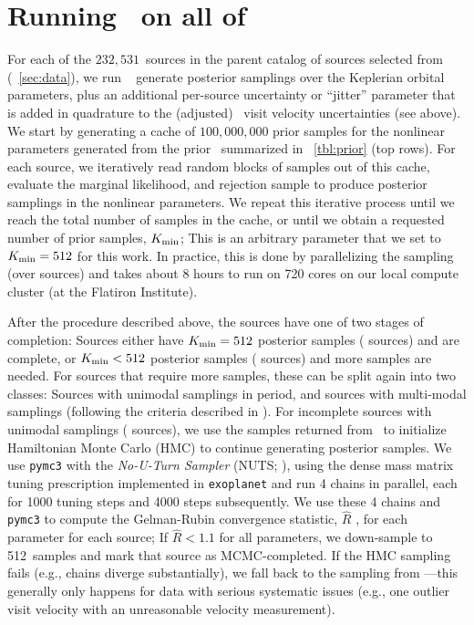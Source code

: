 \documentclass[modern]{aastex63}
\newcommand{\nsources}{\ensuremath{232,531}}
\newcommand{\Kmin}{K_{\rm min}}
\newcommand{\Kminval}{512}
\begin{document}
\section{Running \thejoker\ on all of \apogee\ } \label{sec:rundr16}

For each of the \nsources\ sources in the parent catalog of sources selected
from \apogee\  (\sectionname~\ref{sec:data}), we run \thejoker\
\citep{thejoker} generate posterior samplings over the Keplerian orbital
parameters, plus an additional per-source uncertainty or ``jitter'' parameter
that is added in quadrature to the (adjusted) \apogee\ visit velocity
uncertainties (see above).
We start by generating a cache of $100,000,000$ prior samples for the nonlinear
parameters generated from the prior \pdf\ summarized in
\tablename~\ref{tbl:prior} (top rows).
For each source, we iteratively read random blocks of samples out of this cache,
evaluate the marginal likelihood, and rejection sample to produce posterior
samplings in the nonlinear parameters.
We repeat this iterative process until we reach the total number of samples in
the cache, or until we obtain a requested number of prior samples, $\Kmin$; This
is an arbitrary parameter that we set to $K_{\rm min} = \Kminval$ for this work.
In practice, this is done by parallelizing the sampling (over sources) and takes
about 8 hours to run on 720 cores on our local compute cluster (at the Flatiron
Institute).

After the procedure described above, the sources have one of two stages of
completion: Sources either have $\Kmin = \Kminval$ posterior samples (
sources) and are complete, or $\Kmin < \Kminval$ posterior samples (\todo{XX}
sources) and more samples are needed.
For sources that require more samples, these can be split again into two
classes: Sources with unimodal samplings in period, and sources with multi-modal
samplings (following the criteria described in \citealt{thejoker}).
For incomplete sources with unimodal samplings (\todo{XX} sources), we use the
samples returned from \thejoker\ to initialize Hamiltonian Monte Carlo (HMC) to
continue generating posterior samples.
We use \texttt{pymc3} with the \emph{No-U-Turn Sampler} (NUTS; \citealt{NUTS}),
using the dense mass matrix tuning prescription implemented in
\texttt{exoplanet} \citep{exoplanet:exoplanet} and run 4 chains in parallel,
each for 1000 tuning steps and 4000 steps subsequently.
We use these 4 chains and \texttt{pymc3} to compute the Gelman-Rubin convergence
statistic, $\hat{R}$ \citep{Gelman:1992}, for each parameter for each source; If
$\hat{R} < 1.1$ for all parameters, we down-sample to \Kminval\ samples and mark
that source as MCMC-completed.
If the HMC sampling fails (e.g., chains diverge substantially), we fall back to
the sampling from \thejoker---this generally only happens for data with serious
systematic issues (e.g., one outlier visit velocity with an unreasonable
velocity measurement).
\end{document}
